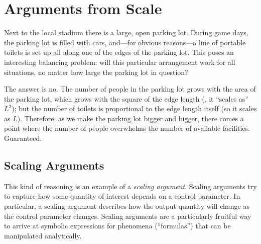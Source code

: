 \vspace*{-6pt}
\section{Arguments from Scale}

  
Next to the local stadium there is a large, open parking lot. During
game days, the parking lot is filled with cars, and---for obvious
reasons---a line of portable toilets is set up all along one of the
edges of the parking lot. This poses an interesting balancing problem:
will this particular arrangement work for all situations, no matter
how large the parking lot in question?

The answer is no. The number of people in the parking lot grows with
the area of the parking lot, which grows with the square of the edge
length (\ie, it ``scales as'' $L^2$); but the number of toilets is
proportional to the edge length itself (so it scales as $L$).
Therefore, as we make the parking lot bigger and bigger, there comes a
point where the number of people overwhelms the number of available
facilities. Guaranteed.

\vspace*{-6pt}
\subsection{Scaling Arguments}

This kind of reasoning is an example of a \emph{scaling argument}.
Scaling arguments try to capture how some quantity of interest depends
on a control parameter. In particular, a scaling argument describes
how the output quantity will change as the control parameter changes.
Scaling arguments are a particularly fruitful way to arrive at
symbolic expressions for phenomena (``formulas'') that can be
manipulated analytically.

